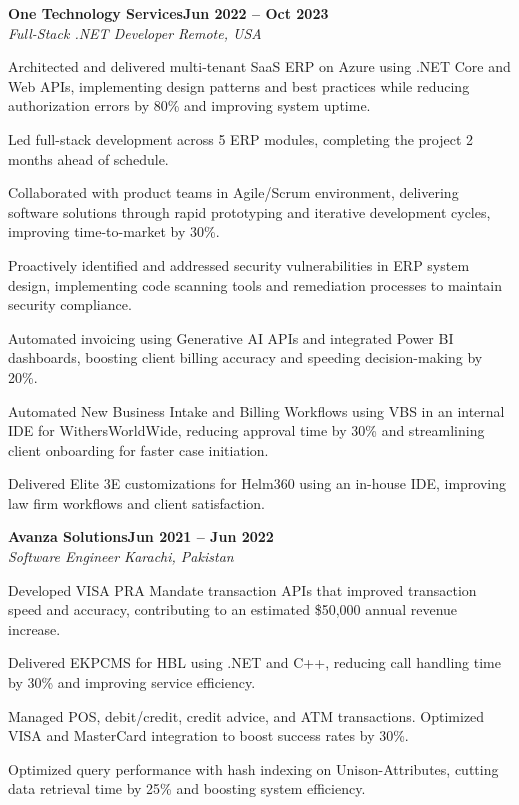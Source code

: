 \documentclass[letterpaper,10pt]{article}
\newcommand{\headingBf}[2]{
  \hspace{10pt}\textbf{#1}\hfill\textbf{#2}\\
}
\newcommand{\headingIt}[2]{
  \hspace{10pt}\textit{#1}\hfill\textit{#2}\\
}
\newenvironment{resume_list}{
  \vspace{-7pt}
  \begin{itemize}[itemsep=-2px, parsep=1pt, leftmargin=30pt]
}{
  \end{itemize}
}
\begin{document}
\headingBf{One Technology Services}{Jun 2022 -- Oct 2023}
\headingIt{Full-Stack .NET Developer \hfill Remote, USA}{}
\begin{resume_list}
    \item Architected and delivered multi-tenant SaaS ERP on Azure using .NET Core and Web APIs, implementing design patterns and best practices while reducing authorization errors by 80\% and improving system uptime.
    \item Led full-stack development across 5 ERP modules, completing the project 2 months ahead of schedule.
    \item Collaborated with product teams in Agile/Scrum environment, delivering software solutions through rapid prototyping and iterative development cycles, improving time-to-market by 30\%.
    \item Proactively identified and addressed security vulnerabilities in ERP system design, implementing code scanning tools and remediation processes to maintain security compliance.
    \item Automated invoicing using Generative AI APIs and integrated Power BI dashboards, boosting client billing accuracy and speeding decision-making by 20\%.
    \item Automated New Business Intake and Billing Workflows using VBS in an internal IDE for WithersWorldWide, reducing approval time by 30\% and streamlining client onboarding for faster case initiation.
    \item Delivered Elite 3E customizations for Helm360 using an in-house IDE, improving law firm workflows and client satisfaction.
\end{resume_list}

\headingBf{Avanza Solutions}{Jun 2021 -- Jun 2022}
\headingIt{Software Engineer \hfill Karachi, Pakistan}{}
\begin{resume_list}
    \item Developed VISA PRA Mandate transaction APIs that improved transaction speed and accuracy, contributing to an estimated \$50,000 annual revenue increase.
    \item Delivered EKPCMS for HBL using .NET and C++, reducing call handling time by 30\% and improving service efficiency.
    \item Managed POS, debit/credit, credit advice, and ATM transactions. Optimized VISA and MasterCard integration to boost success rates by 30\%.
    \item Optimized query performance with hash indexing on Unison-Attributes, cutting data retrieval time by 25\% and boosting system efficiency.
\end{resume_list}
\end{document}
